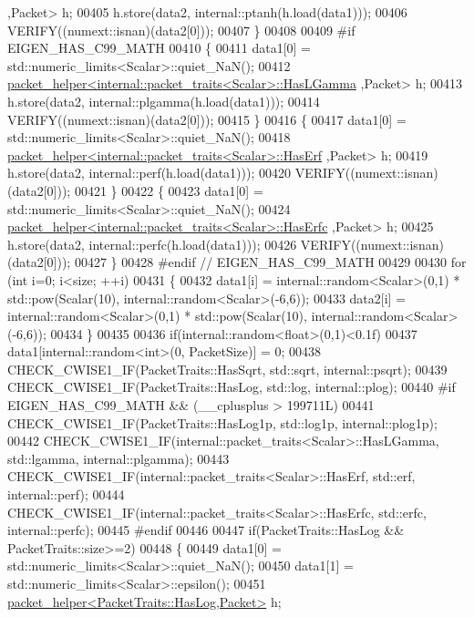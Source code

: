 \begin{DoxyCode}
      ,Packet> h;
00405     h.store(data2, internal::ptanh(h.load(data1)));
00406     VERIFY((numext::isnan)(data2[0]));
00407   \}
00408 
00409 \textcolor{preprocessor}{#if EIGEN\_HAS\_C99\_MATH}
00410   \{
00411     data1[0] = std::numeric\_limits<Scalar>::quiet\_NaN();
00412     \hyperlink{structpacket__helper}{packet\_helper<internal::packet\_traits<Scalar>::HasLGamma}
      ,Packet> h;
00413     h.store(data2, internal::plgamma(h.load(data1)));
00414     VERIFY((numext::isnan)(data2[0]));
00415   \}
00416   \{
00417     data1[0] = std::numeric\_limits<Scalar>::quiet\_NaN();
00418     \hyperlink{structpacket__helper}{packet\_helper<internal::packet\_traits<Scalar>::HasErf}
      ,Packet> h;
00419     h.store(data2, internal::perf(h.load(data1)));
00420     VERIFY((numext::isnan)(data2[0]));
00421   \}
00422   \{
00423     data1[0] = std::numeric\_limits<Scalar>::quiet\_NaN();
00424     \hyperlink{structpacket__helper}{packet\_helper<internal::packet\_traits<Scalar>::HasErfc}
      ,Packet> h;
00425     h.store(data2, internal::perfc(h.load(data1)));
00426     VERIFY((numext::isnan)(data2[0]));
00427   \}
00428 \textcolor{preprocessor}{#endif  // EIGEN\_HAS\_C99\_MATH}
00429 
00430   \textcolor{keywordflow}{for} (\textcolor{keywordtype}{int} i=0; i<size; ++i)
00431   \{
00432     data1[i] = internal::random<Scalar>(0,1) * std::pow(Scalar(10), internal::random<Scalar>(-6,6));
00433     data2[i] = internal::random<Scalar>(0,1) * std::pow(Scalar(10), internal::random<Scalar>(-6,6));
00434   \}
00435 
00436   \textcolor{keywordflow}{if}(internal::random<float>(0,1)<0.1f)
00437     data1[internal::random<int>(0, PacketSize)] = 0;
00438   CHECK\_CWISE1\_IF(PacketTraits::HasSqrt, std::sqrt, internal::psqrt);
00439   CHECK\_CWISE1\_IF(PacketTraits::HasLog, std::log, internal::plog);
00440 \textcolor{preprocessor}{#if EIGEN\_HAS\_C99\_MATH && (\_\_cplusplus > 199711L)}
00441   CHECK\_CWISE1\_IF(PacketTraits::HasLog1p, std::log1p, internal::plog1p);
00442   CHECK\_CWISE1\_IF(internal::packet\_traits<Scalar>::HasLGamma, std::lgamma, internal::plgamma);
00443   CHECK\_CWISE1\_IF(internal::packet\_traits<Scalar>::HasErf, std::erf, internal::perf);
00444   CHECK\_CWISE1\_IF(internal::packet\_traits<Scalar>::HasErfc, std::erfc, internal::perfc);
00445 \textcolor{preprocessor}{#endif}
00446 
00447   \textcolor{keywordflow}{if}(PacketTraits::HasLog && PacketTraits::size>=2)
00448   \{
00449     data1[0] = std::numeric\_limits<Scalar>::quiet\_NaN();
00450     data1[1] = std::numeric\_limits<Scalar>::epsilon();
00451     \hyperlink{structpacket__helper}{packet\_helper<PacketTraits::HasLog,Packet>} h;

\end{DoxyCode}
